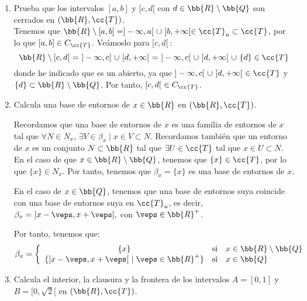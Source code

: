 \begin{ejercicio}
\begin{enumerate}[label=\alph*)]
        \item Prueba que los intervalos $[a,b]$ y $[c,d[$ con $d\in \bb{R}\setminus \bb{Q}$ son cerrados en $(\bb{R},\cc{T})$.\\

        Tenemos que $\bb{R}\setminus [a,b]=]-\infty, a[~\cup~]b,+\infty[\in \cc{T}_u\subset \cc{T}$, por lo que $[a,b]\in C_\cc{T}$. Veámoslo para $[c,d[~$:
        \begin{equation*}
            \bb{R}\setminus [c,d[ ~=~ ]-\infty,c[~\cup~[d,+\infty[~=~ 
            ]-\infty,c[~\cup~]d,+\infty[~\cup~\{d\}\in \cc{T}
        \end{equation*}
        donde he indicado que es un abierto, ya que $]-\infty,c[~\cup~]d,+\infty[~\in \cc{T}$ y $\{d\}\subset \bb{R}\setminus \bb{Q}$. Por tanto, $[c,d[~\in C_\cc{T}$.

        \item Calcula una base de entornos de $x\in \bb{R}$ en $(\bb{R},\cc{T})$.

        Recordamos que una base de entornos de $x$ es una familia de entornos de $x$ tal que $\forall N\in N_x$, $\exists V\in \beta_x\mid x\in V\subset N$. Recordamos también que un entorno de $x$ es un conjunto $N\subset \bb{R}$ tal que $\exists U\in \cc{T}$ tal que $x\in U\subset N$.\\

        En el caso de que $x\in \bb{R}\setminus \bb{Q}$, tenemos que $\{x\}\in \cc{T}$, por lo que $\{x\}\in N_x$. Por tanto, tenemos que $\beta_x=\{x\}$ es una base de entornos de $x$.

        En el caso de $x\in \bb{Q}$, tenemos que una base de entornos suya coincide con una base de entornos suya en $\cc{T}_u$, es decir, $\beta_x=~]x-\veps,x+\veps[,$ con $\veps\in \bb{R}^+$.

        Por tanto, tenemos que:
        \begin{equation*}
            \beta_x = \left\{\begin{array}{ccl}
                \{x\} & \text{si} & x\in \bb{R}\setminus \bb{Q}\\
                \{]x-\veps, x+\veps[~\mid \veps\in \bb{R}^+\}& \text{si} & x\in \bb{Q}
            \end{array}\right.
        \end{equation*}

        \item Calcula el interior, la clausura y la frontera de los intervalos $A=[0,1]$ y $B=[0,\sqrt{2}[$ en $(\bb{R},\cc{T})$.\\


\end{enumerate}
\end{ejercicio}
